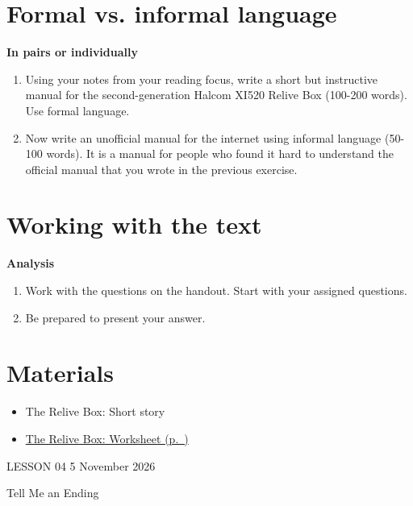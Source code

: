 \documentclass[11pt,a4paper,oneside]{book}
\newcommand{\tasktitle}[1]{{\color{blue}\bfseries #1}\par\smallskip}
\begin{document}
\section*{Formal vs. informal language}
\begin{taskbox}
\tasktitle{In pairs or individually}
\begin{enumerate}
\item Using your notes from your reading focus, write a short but instructive manual for the second-generation Halcom XI520 Relive Box (100-200 words). Use formal language.
\item Now write an unofficial manual for the internet using informal language (50-100 words). It is a manual for people who found it hard to understand the official manual that you wrote in the previous exercise.
\end{enumerate}
\end{taskbox}

\section*{Working with the text}
\begin{taskbox}
\tasktitle{Analysis}
\begin{enumerate}
\item Work with the questions on the handout. Start with your assigned questions.
\item Be prepared to present your answer.
\end{enumerate}
\end{taskbox}

\section*{Materials}

\begin{itemize}
\item The Relive Box: Short story
\item \hyperref[worksheet-17]{The Relive Box: Worksheet (p.~\pageref*{worksheet-17})}
\end{itemize}

\clearpage{}
{\color{blue}\small LESSON 04 \hfill 5 November 2026\par}
\vspace{4mm}
{\displayfont\color{navy}\fontsize{30}{34}\selectfont Tell Me an Ending\par}\vspace{4mm}
\end{document}
